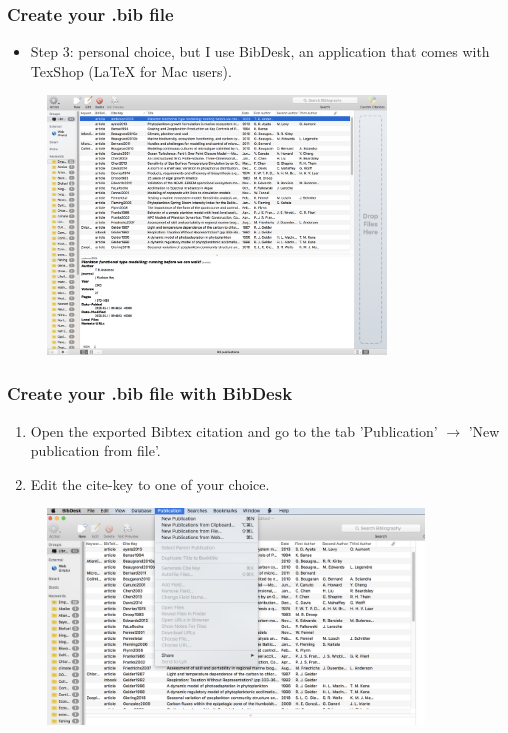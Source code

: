 \begin{frame}[fragile]
\frametitle{Create your .bib file}
\begin{itemize}
\item Step 3: personal choice, but I use BibDesk, an application that comes with TexShop (\LaTeX{} for Mac users).
\end{itemize}
\begin{figure}
\includegraphics[width=90mm]{figures/BibDesk.png}
\end{figure}
\end{frame}


\begin{frame}[fragile]
\frametitle{Create your .bib file with BibDesk}
\begin{enumerate}
\item Open the exported Bibtex citation and go to the tab 'Publication' $\rightarrow$ 'New publication from file'.\\
\item Edit the cite-key to one of your choice. \\
\end{enumerate}
\begin{figure}
\includegraphics[width=100mm]{figures/BibDesk1.png}
\end{figure}
\end{frame}

